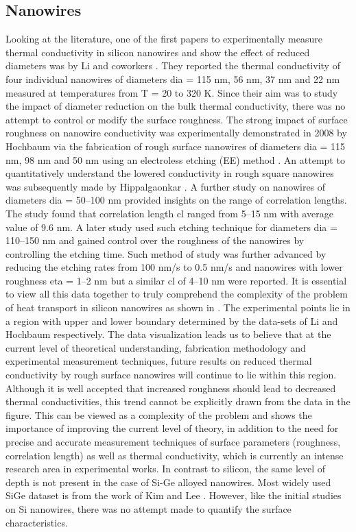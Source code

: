 \subsection{Nanowires}
Looking at the literature, one of the first papers to experimentally measure thermal conductivity in silicon nanowires and show the effect of reduced diameters was by Li and coworkers \cite{RN20}. They reported the thermal conductivity of four individual nanowires of diameters \gls{dia} = 115 nm, 56 nm, 37 nm and 22 nm measured at temperatures from \gls{T} = 20 to 320 \si{\kelvin}. Since their aim was to study the impact of diameter reduction on the bulk thermal conductivity, there was no attempt to control or modify the surface roughness. The strong impact of surface roughness on nanowire conductivity was experimentally demonstrated in 2008 by Hochbaum \etal via the fabrication of rough surface nanowires of diameters \gls{dia} = 115 nm, 98 nm and 50 nm using an electroless etching (EE) method \cite{NW_hochbaum}. An attempt to quantitatively understand the lowered conductivity in rough square nanowires was subsequently made by Hippalgaonkar \etal \cite{RN191}. A further study \cite{RN131} on nanowires of diameters \gls{dia} = 50–100 nm provided insights on the range of correlation lengths. The study found that correlation length \gls{cl} ranged from 5–15 nm with average value of 9.6 nm. A later study \cite{RN67} used such etching technique for diameters \gls{dia} = 110–150 nm and gained control over the roughness of the nanowires by controlling the etching time. Such method of study was further advanced \cite{RN130} by reducing the etching rates from 100 nm/s to 0.5 nm/s and nanowires with lower roughness \gls{eta} = 1–2 nm but a similar \gls{cl} of 4–10 nm were reported. It is essential to view all this data together to truly comprehend the complexity of the problem of heat transport in silicon nanowires as shown in . The experimental points lie in a region with upper and lower boundary determined by the data-sets of Li \etal and Hochbaum \etal respectively. The data visualization leads us to believe that at the current level of theoretical understanding, fabrication methodology and experimental measurement techniques, future results on reduced thermal conductivity by rough surface nanowires will continue to lie within this region. Although it is well accepted that increased roughness should lead to decreased thermal conductivities, this trend cannot be explicitly drawn from the data in the figure. This can be viewed as a complexity of the problem and shows the importance of improving the current level of theory, in addition to the need for precise and accurate measurement techniques of surface parameters (roughness, correlation length) as well as thermal conductivity, which is currently an intense research area in experimental works. In contrast to silicon, the same level of depth is not present in the case of Si-Ge alloyed nanowires. Most widely used SiGe dataset is from the work of Kim \etal \cite{RN111} and Lee \etal \cite{RN520}. However, like the initial studies on Si nanowires, there was no attempt made to quantify the surface characteristics.

